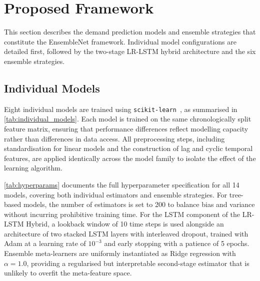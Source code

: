 \documentclass[a4paper,fleqn]{cas-dc}
\begin{document}
\section{Proposed Framework}
\label{sec:models}

This section describes the demand prediction models and ensemble strategies that constitute the EnsembleNet framework.  Individual model configurations are detailed first, followed by the two-stage LR-LSTM hybrid architecture and the six ensemble strategies.

\subsection{Individual Models}

Eight individual models are trained using \texttt{scikit-learn}~\cite{scikit-learn}, as summarised in \autoref{tab:individual_models}.  Each model is trained on the same chronologically split feature matrix, ensuring that performance differences reflect modelling capacity rather than differences in data access.  All preprocessing steps, including standardisation for linear models and the construction of lag and cyclic temporal features, are applied identically across the model family to isolate the effect of the learning algorithm.

\autoref{tab:hyperparams} documents the full hyperparameter specification for all 14 models, covering both individual estimators and ensemble strategies.  For tree-based models, the number of estimators is set to 200 to balance bias and variance without incurring prohibitive training time.  For the LSTM component of the LR-LSTM Hybrid, a lookback window of 10 time steps is used alongside an architecture of two stacked LSTM layers with interleaved dropout, trained with Adam at a learning rate of $10^{-3}$ and early stopping with a patience of 5 epochs.  Ensemble meta-learners are uniformly instantiated as Ridge regression with $\alpha{=}1.0$, providing a regularised but interpretable second-stage estimator that is unlikely to overfit the meta-feature space.
\end{document}
